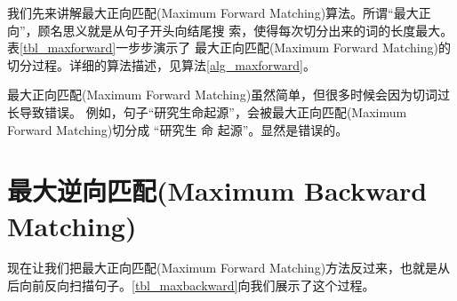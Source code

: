\documentclass[12pt,a4paper]{article}
\def\maxforward{最大正向匹配(Maximum Forward Matching)}
\def\maxbackward{最大逆向匹配(Maximum Backward Matching)}
\begin{document}
我们先来讲解\maxforward 算法。所谓“最大正向”，顾名思义就是从句子开头向结尾搜
索，使得每次切分出来的词的长度最大。表\ref{tbl_maxforward}一步步演示了
\maxforward 的切分过程。详细的算法描述，见算法\ref{alg_maxforward}。

\begin{algorithm}
	\label{alg_maxforward}
	\dontprintsemicolon
	\linesnumbered

	\caption{\maxforward}
\end{algorithm}

\maxforward 虽然简单，但很多时候会因为切词过长导致错误。
例如，句子“研究生命起源”，会被\maxforward 切分成 “研究生 命 起源”。显然是错误的。

\section{\maxbackward}

现在让我们把\maxforward 方法反过来，也就是从后向前反向扫描句子。\ref{tbl_maxbackward}向我们展示了这个过程。
\end{document}
